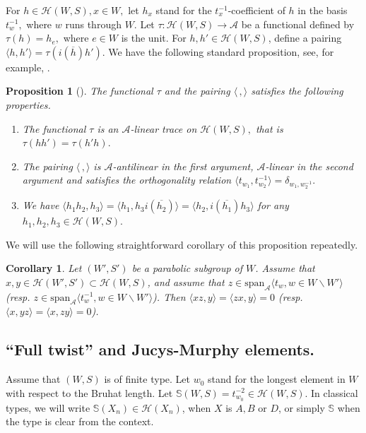 \documentclass[11pt,leqno]{article}
\newtheorem{proposition}[theorem]{Proposition}
\newtheorem{corollary}[theorem]{Corollary}%
\theoremstyle{definition}
\theoremstyle{definition}
\theoremstyle{remark}
\newcommand{\He}{\mathcal{H}}
\newcommand{\Se}{\mathbb{S}}
\begin{document}
For $h \in \He(W,S), x \in W,$ let $h_x$ stand for the $t_x^{-1}$-coefficient of $h$ in the basis $t_w^{-1},$ where $w$ runs through $W$. Let $\tau: \He(W,S) \to \mathcal{A}$ be a functional defined by  $\tau(h) = h_e,$ where $e \in W$ is the unit.  For $h, h' \in \He(W,S)$, define a pairing $\langle h, h' \rangle = \tau(i(\overline{h})h')$. We have the following standard proposition, see, for example, \cite[Chapter 8]{geck2000characters}.
\begin{proposition}[]
  \label{sec:trace-funct-pair}
  The functional $\tau$ and the pairing $\langle\, , \rangle$ satisfies the following properties.
  \begin{enumerate}[label=(\alph*)., ref=(\alph*)]
  \item The functional $\tau$ is an $\mathcal{A}$-linear trace on $\He(W,S),$ that is $\tau(hh') = \tau(h'h).$
  \item The pairing $\langle\, , \rangle$ is $\mathcal{A}$-antilinear in the first argument, $\mathcal{A}$-linear in the second argument and satisfies the orthogonality relation
    \(   \langle t_{w_1} , t^{-1}_{w_2} \rangle = \delta_{w_1, w_2^{-1}}.
    \)
   \item \label{item:3} We have \(\langle h_1h_2, h_3 \rangle = \langle h_1, h_3 i(\overline{h_2})\rangle = \langle h_2,  i(\overline{h_1})h_3\rangle\) for any $h_1, h_2, h_3 \in \He(W,S).$
  \end{enumerate}
\end{proposition}
We will use the following straightforward corollary of this proposition repeatedly.
\begin{corollary}
  \label{sec:trace-funct-pair-1}
  Let $(W',S')$ be a parabolic subgroup of $W$. Assume that $x, y \in \He(W',S') \subset \He(W,S)$, and assume that $z \in \mathrm{span}_\mathcal{A}\langle t_w, w \in W\backslash W'\rangle$ (resp. $z \in \mathrm{span}_\mathcal{A}\langle t_w^{-1}, w \in W\backslash W'\rangle$). Then $\langle xz, y \rangle = \langle zx, y \rangle = 0$ (resp. $\langle x, yz \rangle = \langle x, zy \rangle =0$).
\end{corollary}

\subsection{``Full twist'' and Jucys-Murphy elements.}\label{sec:full-twist-jucys} Assume that $(W, S)$ is of finite type. Let $w_0$ stand for the longest element in $W$ with respect to the Bruhat length. Let $\Se(W,S) = t_{w_0}^{-2} \in \He(W,S)$. In classical types, we will write $\Se(X_n) \in \He(X_n)$, when $X$ is $A, B$ or $D$, or simply $\Se$ when the type is clear from the context.  
\end{document}
